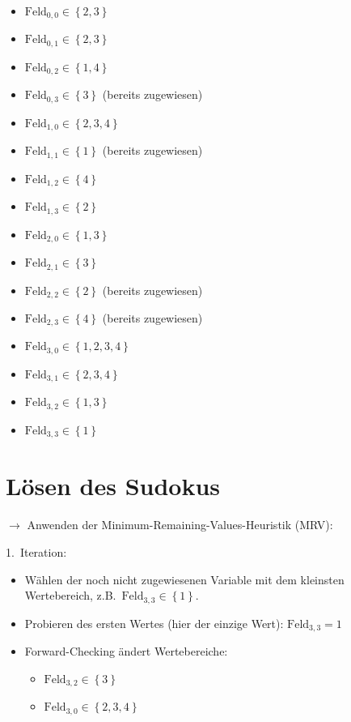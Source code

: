 \documentclass[a4paper,draft=false,oneside,12pt,ngerman]{scrreprt}
\begin{document}
\begin{itemize}
    \item $ \text{Feld}_{0,0} \in \left\{ 2, 3 \right\} $
    \item $ \text{Feld}_{0,1} \in \left\{ 2, 3 \right\} $
    \item $ \text{Feld}_{0,2} \in \left\{ 1, 4 \right\} $
    \item $ \text{Feld}_{0,3} \in \left\{ 3 \right\} $ (bereits zugewiesen)
    \item $ \text{Feld}_{1,0} \in \left\{ 2, 3, 4 \right\} $
    \item $ \text{Feld}_{1,1} \in \left\{ 1 \right\} $ (bereits zugewiesen)
    \item $ \text{Feld}_{1,2} \in \left\{ 4 \right\} $
    \item $ \text{Feld}_{1,3} \in \left\{ 2 \right\} $
    \item $ \text{Feld}_{2,0} \in \left\{ 1, 3 \right\} $
    \item $ \text{Feld}_{2,1} \in \left\{ 3 \right\} $
    \item $ \text{Feld}_{2,2} \in \left\{ 2 \right\} $ (bereits zugewiesen)
    \item $ \text{Feld}_{2,3} \in \left\{ 4 \right\} $ (bereits zugewiesen)
    \item $ \text{Feld}_{3,0} \in \left\{ 1, 2, 3, 4 \right\} $
    \item $ \text{Feld}_{3,1} \in \left\{ 2, 3, 4 \right\} $
    \item $ \text{Feld}_{3,2} \in \left\{ 1, 3 \right\} $
    \item $ \text{Feld}_{3,3} \in \left\{ 1 \right\} $
\end{itemize}

\section{Lösen des Sudokus}
\label{sec:loesen_des_sudokus}

$\rightarrow$ Anwenden der Minimum-Remaining-Values-Heuristik (MRV):

1.\ Iteration:

\begin{itemize}
    \item Wählen der noch nicht zugewiesenen Variable mit dem kleinsten
        Wertebereich, z.B.\ $ \text{Feld}_{3,3} \in \left\{ 1 \right\} $.
    \item Probieren des ersten Wertes (hier der einzige Wert): $
        \text{Feld}_{3,3} = 1 $
    \item Forward-Checking ändert Wertebereiche:
        \begin{itemize}
            \item $ \text{Feld}_{3,2} \in \left\{ 3 \right\} $
            \item $ \text{Feld}_{3,0} \in \left\{ 2, 3, 4 \right\} $
        \end{itemize}
\end{itemize}
\end{document}
